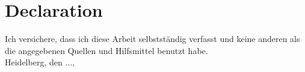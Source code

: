 
\section*{Declaration}

Ich versichere, dass ich diese Arbeit selbstst\"{a}ndig verfasst und keine
anderen als die angegebenen Quellen und Hilfsmittel benutzt habe.
\\

Heidelberg, den ...,


